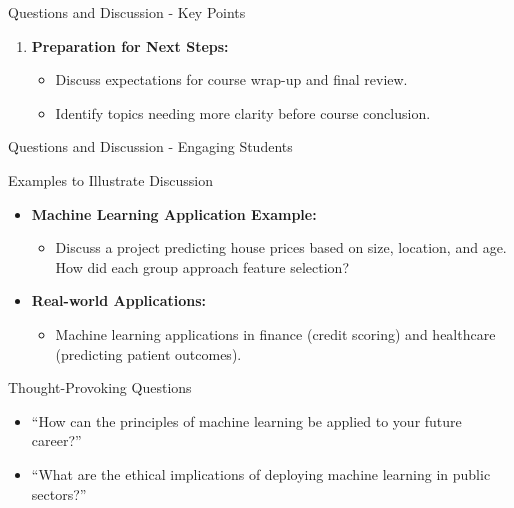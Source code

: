 \documentclass[aspectratio=169]{beamer}
\begin{document}
\begin{frame}[fragile]{Questions and Discussion - Key Points}
\begin{enumerate}
        \item \textbf{Preparation for Next Steps:}
        \begin{itemize}
            \item Discuss expectations for course wrap-up and final review.
            \item Identify topics needing more clarity before course conclusion.
        \end{itemize}
    \end{enumerate}
\end{frame}

\begin{frame}[fragile]{Questions and Discussion - Engaging Students}
    \begin{block}{Examples to Illustrate Discussion}
        \begin{itemize}
            \item \textbf{Machine Learning Application Example:}
            \begin{itemize}
                \item Discuss a project predicting house prices based on size, location, and age. How did each group approach feature selection?
            \end{itemize}
            \item \textbf{Real-world Applications:}
            \begin{itemize}
                \item Machine learning applications in finance (credit scoring) and healthcare (predicting patient outcomes).
            \end{itemize}
        \end{itemize}
    \end{block}
    
    \begin{block}{Thought-Provoking Questions}
        \begin{itemize}
            \item “How can the principles of machine learning be applied to your future career?”
            \item “What are the ethical implications of deploying machine learning in public sectors?”
        \end{itemize}
    \end{block}
\end{frame}
\end{document}
